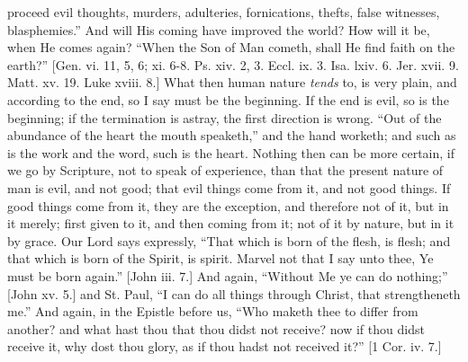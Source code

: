 proceed evil thoughts, murders, adulteries, fornications, thefts,
false witnesses, blasphemies.'' And will His coming have improved
the world? How will it be, when He comes again? ``When the Son of
Man cometh, shall He find faith on the earth?'' [Gen. vi. 11, 5,
6; xi. 6-8. Ps. xiv. 2, 3. Eccl. ix. 3. Isa. lxiv. 6. Jer. xvii. 9.
Matt. xv. 19. Luke xviii. 8.] What then human nature \emph{tends} to,
is very plain, and according to the end, so I say must be the
beginning. If the end is evil, so is the beginning; if the termination
is astray, the first direction is wrong. ``Out of the abundance of
the heart the mouth speaketh,'' and the hand worketh; and such as
is the work and the word, such is the heart. Nothing then can be more
certain, if we go by Scripture, not to speak of experience, than that
the present nature of man is evil, and not good; that evil things come
from it, and not good things. If good things come from it, they are
the exception, and therefore not of it, but in it merely; first given
to it, and then coming from it; not of it by nature, but in it by
grace. Our Lord says expressly, ``That which is born of the flesh,
is flesh; and that which is born of the Spirit, is spirit. Marvel not
that I say unto thee, Ye must be born again.'' [John iii. 7.] And
again, ``Without Me ye can do nothing;'' [John xv. 5.] and St.
Paul, ``I can do all things through Christ, that strengtheneth
me.'' And again, in the Epistle before us, ``Who maketh thee
to differ from another? and what hast thou that thou didst not
receive? now if thou didst receive it, why dost thou glory, as if thou
hadst not received it?'' [1 Cor. iv. 7.]

